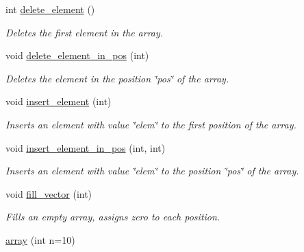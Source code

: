 \begin{DoxyCompactItemize}
\item 
\hypertarget{classarray_a1264f89751d04076f0c9e40dd548b34a}{int \hyperlink{classarray_a1264f89751d04076f0c9e40dd548b34a}{delete\-\_\-element} ()}\label{classarray_a1264f89751d04076f0c9e40dd548b34a}

\begin{DoxyCompactList}\small\item\em Deletes the first element in the array. \end{DoxyCompactList}\item 
\hypertarget{classarray_a6866ed5e8568471e8fa5012214e8b31b}{void \hyperlink{classarray_a6866ed5e8568471e8fa5012214e8b31b}{delete\-\_\-element\-\_\-in\-\_\-pos} (int)}\label{classarray_a6866ed5e8568471e8fa5012214e8b31b}

\begin{DoxyCompactList}\small\item\em Deletes the element in the position \char`\"{}pos\char`\"{} of the array. \end{DoxyCompactList}\item 
\hypertarget{classarray_aeddcdc0e56dc8cea81f9031200722317}{void \hyperlink{classarray_aeddcdc0e56dc8cea81f9031200722317}{insert\-\_\-element} (int)}\label{classarray_aeddcdc0e56dc8cea81f9031200722317}

\begin{DoxyCompactList}\small\item\em Inserts an element with value \char`\"{}elem\char`\"{} to the first position of the array. \end{DoxyCompactList}\item 
\hypertarget{classarray_a3f88ff1af571a2a320e6ef79de2722fb}{void \hyperlink{classarray_a3f88ff1af571a2a320e6ef79de2722fb}{insert\-\_\-element\-\_\-in\-\_\-pos} (int, int)}\label{classarray_a3f88ff1af571a2a320e6ef79de2722fb}

\begin{DoxyCompactList}\small\item\em Inserts an element with value \char`\"{}elem\char`\"{} to the position \char`\"{}pos\char`\"{} of the array. \end{DoxyCompactList}\item 
\hypertarget{classarray_a1907d4f2b944c0acd6f45d4659e49646}{void \hyperlink{classarray_a1907d4f2b944c0acd6f45d4659e49646}{fill\-\_\-vector} (int)}\label{classarray_a1907d4f2b944c0acd6f45d4659e49646}

\begin{DoxyCompactList}\small\item\em Fills an empty array, assigns zero to each position. \end{DoxyCompactList}\item 
\hypertarget{classarray_aedfc14adc0aaa8398258794564f79b22}{\hyperlink{classarray_aedfc14adc0aaa8398258794564f79b22}{array} (int n=10)}\label{classarray_aedfc14adc0aaa8398258794564f79b22}


\end{DoxyCompactItemize}
